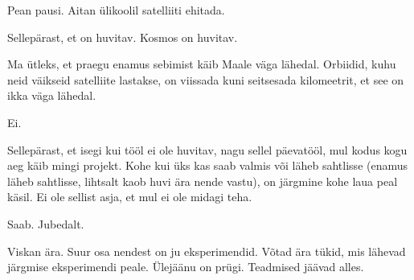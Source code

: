 
Pean pausi. Aitan ülikoolil satelliiti ehitada. 


Sellepärast, et on huvitav. Kosmos on huvitav.


Ma ütleks, et praegu enamus sebimist käib Maale väga lähedal. Orbiidid, kuhu 
neid väikseid satelliite lastakse, on viissada kuni seitsesada kilomeetrit, et 
see on ikka väga lähedal.


Ei.


Sellepärast, et isegi kui tööl ei ole  huvitav, nagu sellel päevatööl, mul 
kodus kogu aeg käib mingi projekt. Kohe kui üks kas saab valmis või läheb 
sahtlisse (enamus läheb sahtlisse, lihtsalt kaob huvi ära nende vastu), on 
järgmine kohe laua peal käsil. Ei ole sellist asja, et mul ei ole midagi teha.


Saab. Jubedalt. 


Viskan ära. Suur osa nendest on ju eksperimendid. Võtad ära tükid, mis lähevad  
järgmise eksperimendi peale. Ülejäänu on prügi. Teadmised jäävad alles.
